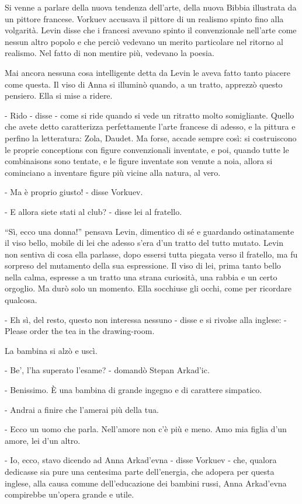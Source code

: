 Si venne a parlare della nuova tendenza dell'arte, della nuova Bibbia illustrata da un pittore francese. Vorkuev accusava il pittore di un realismo spinto fino alla volgarità. Levin disse che i francesi avevano spinto il convenzionale nell'arte come nessun altro popolo e che perciò vedevano un merito particolare nel ritorno al realismo. Nel fatto di non mentire più, vedevano la poesia. 

Mai ancora nessuna cosa intelligente detta da Levin le aveva fatto tanto piacere come questa. Il viso di Anna si illuminò quando, a un tratto, apprezzò questo pensiero. Ella si mise a ridere. 

- Rido - disse - come si ride quando si vede un ritratto molto somigliante. Quello che avete detto caratterizza perfettamente l'arte francese di adesso, e la pittura e perfino la letteratura: Zola, Daudet. Ma forse, accade sempre così: si costruiscono le proprie conceptions con figure convenzionali inventate, e poi, quando tutte le combinaisons sono tentate, e le figure inventate son venute a noia, allora si cominciano a inventare figure più vicine alla natura, al vero. 

- Ma è proprio giusto! - disse Vorkuev. 

- E allora siete stati al club? - disse lei al fratello. 

``Sì, ecco una donna!'' pensava Levin, dimentico di sé e guardando ostinatamente il viso bello, mobile di lei che adesso s'era d'un tratto del tutto mutato. Levin non sentiva di cosa ella parlasse, dopo essersi tutta piegata verso il fratello, ma fu sorpreso del mutamento della sua espressione. Il viso di lei, prima tanto bello nella calma, espresse a un tratto una strana curiosità, una rabbia e un certo orgoglio. Ma durò solo un momento. Ella socchiuse gli occhi, come per ricordare qualcosa. 

- Eh sì, del resto, questo non interessa nessuno - disse e si rivolse alla inglese: - Please order the tea in the drawing-room. 

La bambina si alzò e uscì. 

- Be', l'ha superato l'esame? - domandò Stepan Arkad'ic. 

- Benissimo. È una bambina di grande ingegno e di carattere simpatico. 

- Andrai a finire che l'amerai più della tua. 

- Ecco un uomo che parla. Nell'amore non c'è più e meno. Amo mia figlia d'un amore, lei d'un altro. 

- Io, ecco, stavo dicendo ad Anna Arkad'evna - disse Vorkuev - che, qualora dedicasse sia pure una centesima parte dell'energia, che adopera per questa inglese, alla causa comune dell'educazione dei bambini russi, Anna Arkad'evna compirebbe un'opera grande e utile. 


